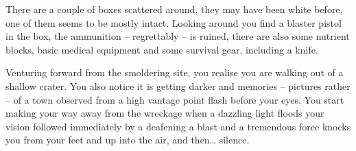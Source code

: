 \documentclass[a4paper,10pt]{book}
\begin{document}
There are a couple of boxes scattered around, they may have been white before,
one of them seems to be mostly intact.  Looking around you find a blaster
pistol in the box, the ammunition -- regrettably -- is ruined, there are also
some nutrient blocks, basic medical equipment and some survival gear, including
a knife.

Venturing forward from the smoldering site, you realise you are walking out of
a shallow crater. You also notice it is getting darker and memories -- pictures
rather -- of a town observed from a high vantage point flash before your eyes.
You start making your way away from the wreckage when a dazzling light floods
your vision followed immediately by a deafening a blast and a tremendous force
knocks you from your feet and up into the air, and then\ldots{} silence.
\end{document}
